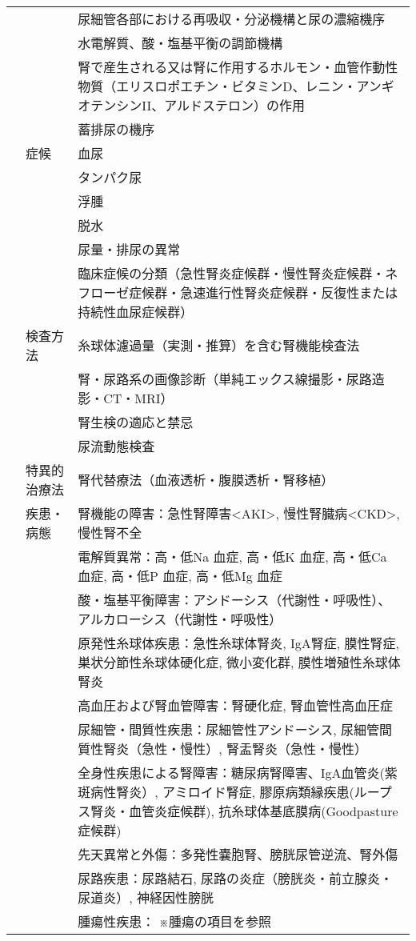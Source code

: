 \begin{xltabular}{\linewidth}{XXX}
 &  & 尿細管各部における再吸収・分泌機構と尿の濃縮機序 \\
 &  & 水電解質、酸・塩基平衡の調節機構 \\
 &  & 腎で産生される又は腎に作用するホルモン・血管作動性物質（エリスロポエチン・ビタミンD、レニン・アンギオテンシンII、アルドステロン）の作用 \\
 &  & 蓄排尿の機序 \\
 & 症候 & 血尿 \\
 &  & タンパク尿 \\
 &  & 浮腫 \\
 &  & 脱水 \\
 &  & 尿量・排尿の異常 \\
 &  & 臨床症候の分類（急性腎炎症候群・慢性腎炎症候群・ネフローゼ症候群・急速進行性腎炎症候群・反復性または持続性血尿症候群） \\
 & 検査方法 & 糸球体濾過量（実測・推算）を含む腎機能検査法 \\
 &  & 腎・尿路系の画像診断（単純エックス線撮影・尿路造影・CT・MRI） \\
 &  & 腎生検の適応と禁忌 \\
 &  & 尿流動態検査 \\
 & 特異的治療法 & 腎代替療法（血液透析・腹膜透析・腎移植） \\
 & 疾患・病態 & 腎機能の障害：急性腎障害<AKI>, 慢性腎臓病<CKD>, 慢性腎不全 \\
 &  & 電解質異常：高・低Na 血症, 高・低K 血症, 高・低Ca 血症, 高・低P 血症, 高・低Mg 血症 \\
 &  & 酸・塩基平衡障害：アシドーシス（代謝性・呼吸性）、アルカローシス（代謝性・呼吸性） \\
 &  & 原発性糸球体疾患：急性糸球体腎炎, IgA腎症, 膜性腎症, 巣状分節性糸球体硬化症, 微小変化群, 膜性増殖性糸球体腎炎 \\
 &  & 高血圧および腎血管障害：腎硬化症, 腎血管性高血圧症 \\
 &  & 尿細管・間質性疾患：尿細管性アシドーシス, 尿細管間質性腎炎（急性・慢性）, 腎盂腎炎（急性・慢性） \\
 &  & 全身性疾患による腎障害：糖尿病腎障害、IgA血管炎(紫斑病性腎炎）, アミロイド腎症, 膠原病類縁疾患(ループス腎炎・血管炎症候群), 抗糸球体基底膜病(Goodpasture症候群) \\
 &  & 先天異常と外傷：多発性嚢胞腎、膀胱尿管逆流、腎外傷 \\
 &  & 尿路疾患：尿路結石, 尿路の炎症（膀胱炎・前立腺炎・尿道炎）, 神経因性膀胱 \\
 &  & 腫瘍性疾患： ※腫瘍の項目を参照 \\

\end{xltabular}
